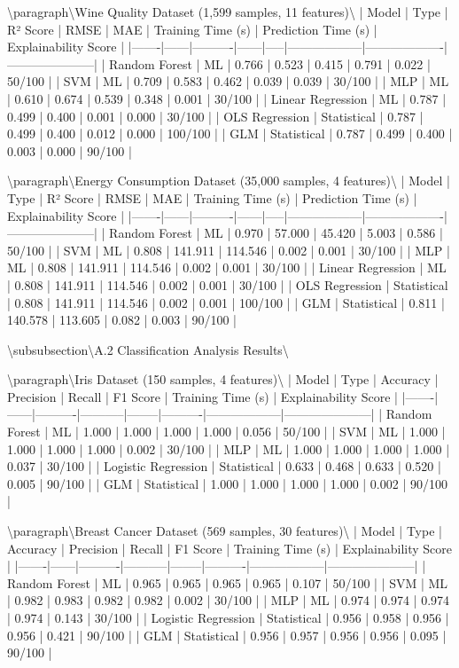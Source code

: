 \documentclass[11pt,a4paper]{article}
\begin{document}
\textbackslash{}paragraph\textbackslash{}{Wine Quality Dataset (1,599 samples, 11 features)\textbackslash{}}
| Model | Type | R² Score | RMSE | MAE | Training Time (s) | Prediction Time (s) | Explainability Score |
|-------|------|----------|------|-----|------------------|-------------------|---------------------|
| Random Forest | ML | 0.766 | 0.523 | 0.415 | 0.791 | 0.022 | 50/100 |
| SVM | ML | 0.709 | 0.583 | 0.462 | 0.039 | 0.039 | 30/100 |
| MLP | ML | 0.610 | 0.674 | 0.539 | 0.348 | 0.001 | 30/100 |
| Linear Regression | ML | 0.787 | 0.499 | 0.400 | 0.001 | 0.000 | 30/100 |
| OLS Regression | Statistical | 0.787 | 0.499 | 0.400 | 0.012 | 0.000 | 100/100 |
| GLM | Statistical | 0.787 | 0.499 | 0.400 | 0.003 | 0.000 | 90/100 |

\textbackslash{}paragraph\textbackslash{}{Energy Consumption Dataset (35,000 samples, 4 features)\textbackslash{}}
| Model | Type | R² Score | RMSE | MAE | Training Time (s) | Prediction Time (s) | Explainability Score |
|-------|------|----------|------|-----|------------------|-------------------|---------------------|
| Random Forest | ML | 0.970 | 57.000 | 45.420 | 5.003 | 0.586 | 50/100 |
| SVM | ML | 0.808 | 141.911 | 114.546 | 0.002 | 0.001 | 30/100 |
| MLP | ML | 0.808 | 141.911 | 114.546 | 0.002 | 0.001 | 30/100 |
| Linear Regression | ML | 0.808 | 141.911 | 114.546 | 0.002 | 0.001 | 30/100 |
| OLS Regression | Statistical | 0.808 | 141.911 | 114.546 | 0.002 | 0.001 | 100/100 |
| GLM | Statistical | 0.811 | 140.578 | 113.605 | 0.082 | 0.003 | 90/100 |

\textbackslash{}subsubsection\textbackslash{}{A.2 Classification Analysis Results\textbackslash{}}

\textbackslash{}paragraph\textbackslash{}{Iris Dataset (150 samples, 4 features)\textbackslash{}}
| Model | Type | Accuracy | Precision | Recall | F1 Score | Training Time (s) | Explainability Score |
|-------|------|----------|-----------|--------|----------|------------------|---------------------|
| Random Forest | ML | 1.000 | 1.000 | 1.000 | 1.000 | 0.056 | 50/100 |
| SVM | ML | 1.000 | 1.000 | 1.000 | 1.000 | 0.002 | 30/100 |
| MLP | ML | 1.000 | 1.000 | 1.000 | 1.000 | 0.037 | 30/100 |
| Logistic Regression | Statistical | 0.633 | 0.468 | 0.633 | 0.520 | 0.005 | 90/100 |
| GLM | Statistical | 1.000 | 1.000 | 1.000 | 1.000 | 0.002 | 90/100 |

\textbackslash{}paragraph\textbackslash{}{Breast Cancer Dataset (569 samples, 30 features)\textbackslash{}}
| Model | Type | Accuracy | Precision | Recall | F1 Score | Training Time (s) | Explainability Score |
|-------|------|----------|-----------|--------|----------|------------------|---------------------|
| Random Forest | ML | 0.965 | 0.965 | 0.965 | 0.965 | 0.107 | 50/100 |
| SVM | ML | 0.982 | 0.983 | 0.982 | 0.982 | 0.002 | 30/100 |
| MLP | ML | 0.974 | 0.974 | 0.974 | 0.974 | 0.143 | 30/100 |
| Logistic Regression | Statistical | 0.956 | 0.958 | 0.956 | 0.956 | 0.421 | 90/100 |
| GLM | Statistical | 0.956 | 0.957 | 0.956 | 0.956 | 0.095 | 90/100 |
\end{document}
